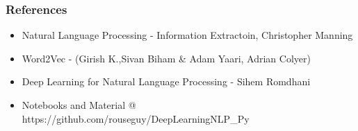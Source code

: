 \begin{frame}\frametitle{References}
\begin{itemize}
\item Natural Language Processing - Information Extractoin, Christopher Manning
\item Word2Vec - (Girish K.,Sivan Biham \& Adam Yaari, Adrian Colyer)
\item Deep Learning for Natural Language Processing - Sihem Romdhani
\item Notebooks and Material @ https://github.com/rouseguy/DeepLearningNLP\_Py
\end{itemize}
\end{frame}

